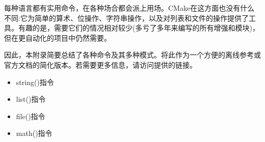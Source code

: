 每种语言都有实用命令，在各种场合都会派上用场。CMake在这方面也没有什么不同:它为简单的算术、位操作、字符串操作，以及对列表和文件的操作提供了工具。有趣的是，需要它们的情况相对较少(多亏了多年来编写的所有增强和模块)，但在更自动化的项目中仍然需要。

因此，本附录简要总结了各种命令及其多种模式。将此作为一个方便的离线参考或官方文档的简化版本。若需要更多信息，请访问提供的链接。

\begin{itemize}
\item 
string()指令

\item 
list()指令

\item 
file()指令

\item 
math()指令
\end{itemize}



















